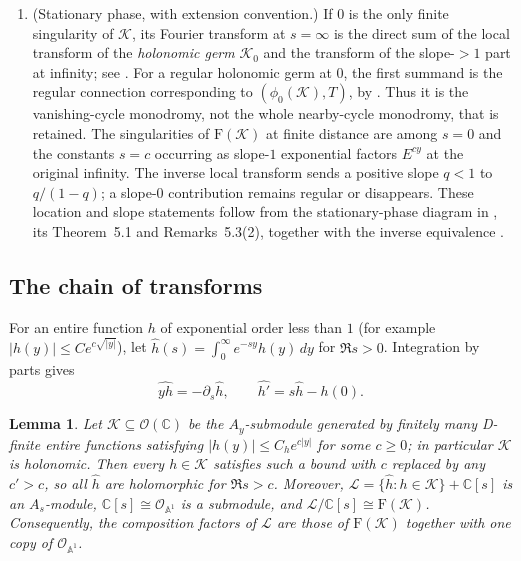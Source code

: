\documentclass[11pt,a4paper]{article}
\newtheorem{lemma}[theorem]{Lemma}
\theoremstyle{definition}
\theoremstyle{remark}
\numberwithin{equation}{section}
\newcommand{\C}{\mathbb{C}}
\newcommand{\A}{\mathbb{A}}
\newcommand{\cL}{\mathcal{L}}
\newcommand{\cO}{\mathcal{O}}
\newcommand{\Four}{\mathrm{F}}
\begin{document}
\begin{enumerate}
\item[(F5)] (Stationary phase, with extension convention.) If $0$ is the only finite singularity of $\mathcal K$, its Fourier transform at $s=\infty$ is the direct sum of the local transform of the \emph{holonomic germ} $\mathcal K_0$ and the transform of the slope-$>1$ part at infinity; see \cite[\S1, formal stationary-phase theorem]{GL04}. For a regular holonomic germ at $0$, the first summand is the regular connection corresponding to $(\phi_0(\mathcal K),T)$, by \cite[Remark~5.7, p.~326]{Sab08}. Thus it is the vanishing-cycle monodromy, not the whole nearby-cycle monodromy, that is retained. The singularities of $\Four(\mathcal K)$ at finite distance are among $s=0$ and the constants $s=c$ occurring as slope-$1$ exponential factors $E^{cy}$ at the original infinity. The inverse local transform sends a positive slope $q<1$ to $q/(1-q)$; a slope-$0$ contribution remains regular or disappears. These location and slope statements follow from the stationary-phase diagram in \cite[Introduction, p.~310]{Sab08}, its Theorem~5.1 and Remarks~5.3(2), together with the inverse equivalence \cite[Prop.~3.10]{BE04}.
\end{enumerate}

\subsection{The chain of transforms}
For an entire function $h$ of exponential order less than $1$ (for example $|h(y)|\le Ce^{c\sqrt{|y|}}$), let $\widehat h(s)=\int_0^\infty e^{-sy}h(y)\,dy$ for $\Re s>0$. Integration by parts gives
\begin{equation}\label{bo:eq:laplace}
\widehat{yh}=-\partial_s\widehat h,\qquad\widehat{h'}=s\widehat h-h(0).
\end{equation}

\begin{lemma}\label{bo:lem:Lmodule}
Let $\mathcal K\subseteq\cO(\C)$ be the $A_y$-submodule generated by finitely many D-finite entire functions satisfying $|h(y)|\le C_he^{c|y|}$ for some $c\ge0$; in particular $\mathcal K$ is holonomic. Then every $h\in\mathcal K$ satisfies such a bound with $c$ replaced by any $c'>c$, so all $\widehat h$ are holomorphic for $\Re s>c$. Moreover, $\cL=\{\widehat h:h\in\mathcal K\}+\C[s]$ is an $A_s$-module, $\C[s]\cong\cO_{\A^1}$ is a submodule, and $\cL/\C[s]\cong\Four(\mathcal K)$. Consequently, the composition factors of $\cL$ are those of $\Four(\mathcal K)$ together with one copy of $\cO_{\A^1}$.
\end{lemma}
\end{document}
